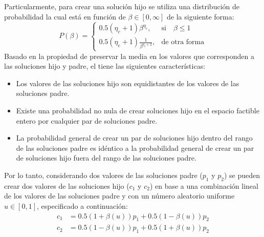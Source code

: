 %
Particularmente, para crear una solución hijo se utiliza una distribución de probabilidad la cual está en función de $\beta \in [0, \infty]$ de la siguiente forma:
%
\begin{equation}
    P(\beta)= 
\begin{cases}
     0.5(\eta_c + 1)\beta^{\eta_c},& \text{si} \quad \beta \leq 1\\
     0.5(\eta_c + 1) \frac{1}{\beta^{\eta_c + 2}} ,& \text{de otra forma}
\end{cases}
\end{equation}
%
Basado en la propiedad de preservar la media en los valores que corresponden a las soluciones hijo y padre, el \SBX{} tiene las siguientes características:
\begin{itemize}
\item Los valores de las soluciones hijo son equidistantes de los valores de las soluciones padre.
\item Existe una probabilidad no nula de crear soluciones hijo en el espacio factible entero por cualquier par de soluciones padre.
\item La probabilidad general de crear un par de soluciones hijo dentro del rango de las soluciones padre es idéntico a la probabilidad general de crear un par de soluciones hijo fuera del rango de las soluciones padre.
\end{itemize}

Por lo tanto, considerando dos valores de las soluciones padre ($p_1$ y $p_2$) se pueden crear dos valores de las soluciones hijo ($c_1$ y $c_2$) en base a una combinación lineal de los valores de las soluciones padre y con un número aleatorio uniforme $u \in [0, 1]$, especificado a continuación:
\begin{equation} 
\begin{split}
c_1 &= 0.5(1 + \beta(u))p_1 + 0.5(1 - \beta(u)) p_2 \\
c_2 &= 0.5(1 - \beta(u))p_1 + 0.5(1 + \beta(u)) p_2
\end{split}
\end{equation}

